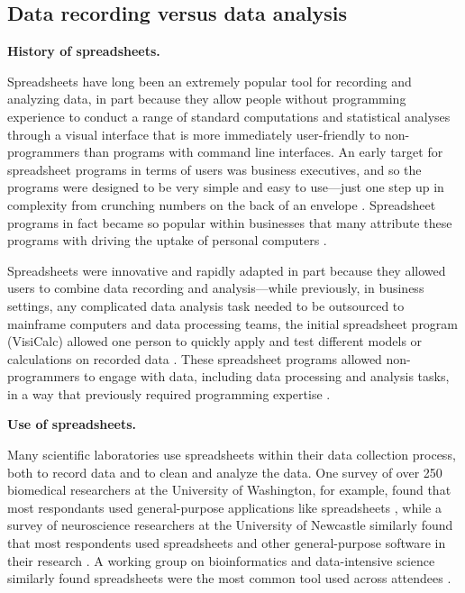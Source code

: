\documentclass[]{tufte-book}
\begin{document}
\hypertarget{data-recording-versus-data-analysis}{%
\subsection{Data recording versus data analysis}\label{data-recording-versus-data-analysis}}

\textbf{History of spreadsheets.}

Spreadsheets have long been an extremely popular tool for recording and
analyzing data, in part because they allow people without programming experience
to conduct a range of standard computations and statistical analyses through a
visual interface that is more immediately user-friendly to non-programmers than
programs with command line interfaces. An early target for spreadsheet programs
in terms of users was business executives, and so the programs were designed to
be very simple and easy to use---just one step up in complexity from crunching
numbers on the back of an envelope \citep{campbell2007number}. Spreadsheet programs
in fact became so popular within businesses that many attribute these programs
with driving the uptake of personal computers \citep{campbell2007number}.

Spreadsheets were innovative and rapidly adapted in part because they allowed
users to combine data recording and analysis---while previously, in business
settings, any complicated data analysis task needed to be outsourced to
mainframe computers and data processing teams, the initial spreadsheet program
(VisiCalc) allowed one person to quickly apply and test different models or
calculations on recorded data \citep{levy1984spreadsheet}. These spreadsheet programs
allowed non-programmers to engage with data, including data processing and
analysis tasks, in a way that previously required programming expertise
\citep{levy1984spreadsheet}.

\textbf{Use of spreadsheets.}

Many scientific laboratories use spreadsheets within their data collection
process, both to record data and to clean and analyze the data. One survey of
over 250 biomedical researchers at the University of Washington, for example,
found that most respondants used general-purpose applications like spreadsheets
\citep{anderson2007issues}, while a survey of neuroscience researchers at the
University of Newcastle similarly found that most respondents used spreadsheets
and other general-purpose software in their research \citep{altarawneh2017pilot}. A
working group on bioinformatics and data-intensive science similarly found
spreadsheets were the most common tool used across attendees
\citep{barga2011bioinformatics}.
\end{document}
